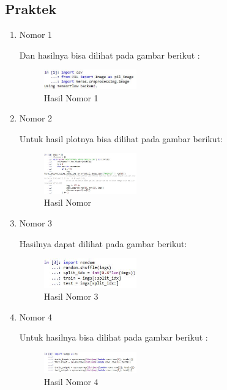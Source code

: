 \subsection{Praktek}
\begin{enumerate}
\item Nomor 1

Dan hasilnya bisa dilihat pada gambar berikut :
\hfill\break
	\begin{figure}[H]
		\includegraphics[width=4cm]{figures/1174054/7/11.png}
		\centering
		\caption{Hasil Nomor 1}
	\end{figure}

\item Nomor 2
\hfill\break
	
Untuk hasil plotnya bisa dilihat pada gambar berikut:
\hfill\break
	\begin{figure}[H]
		\includegraphics[width=4cm]{figures/1174054/7/12.JPG}
		\centering
		\caption{Hasil Nomor}
	\end{figure}
	
\item Nomor 3
\hfill\break
	
Hasilnya dapat dilihat pada gambar berikut:
\hfill\break
	\begin{figure}[H]
		\includegraphics[width=4cm]{figures/1174054/7/13.JPG}
		\centering
		\caption{Hasil Nomor 3}
	\end{figure}
	
\item Nomor 4
\hfill\break
	
Untuk hasilnya bisa dilihat pada gambar berikut :
\hfill\break
	\begin{figure}[H]
		\includegraphics[width=4cm]{figures/1174054/7/14.JPG}
		\centering
		\caption{Hasil Nomor 4}
	\end{figure}	


\end{enumerate}
